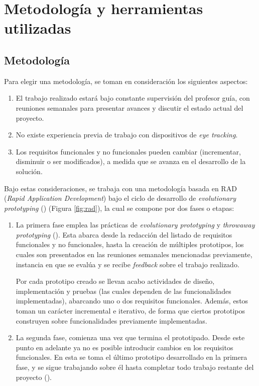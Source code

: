 \section{Metodolog\'ia y herramientas utilizadas}
\label{intro:metodologia}

\subsection{Metodolog\'ia}
Para elegir una metodología, se toman en consideración los siguientes aspectos:
\begin{enumerate}
    \item El trabajo realizado estará bajo constante supervisión del profesor guía, con reuniones semanales para presentar avances y discutir el estado actual del proyecto.
    \item No existe experiencia previa de trabajo con dispositivos de \textit{eye tracking}.
    \item Los requisitos funcionales y no funcionales pueden cambiar (incrementar, disminuir o ser modificados), a medida que se avanza en el desarrollo de la solución.
\end{enumerate}

Bajo estas consideraciones, se trabaja con una metodología basada en RAD (\textit{Rapid Application Development}) bajo el ciclo de desarrollo de \textit{evolutionary prototyping} (\cite{mcconnell_96}) (Figura \ref{fig:rad}), la cual se compone por dos fases o etapas:

\begin{enumerate}
    \item La primera fase emplea las prácticas de \textit{evolutionary prototyping} y \textit{throwaway prototyping} (\cite{mcconnell_96}). Esta abarca desde la redacción del listado de requisitos funcionales y no funcionales, hasta la creación de múltiples prototipos, los cuales son presentados en las reuniones semanales mencionadas previamente, instancia en que se evalúa y se recibe \textit{feedback} sobre el trabajo realizado.

    Por cada prototipo creado se llevan acabo actividades de diseño, implementación y pruebas (las cuales dependen de las funcionalidades implementadas), abarcando uno o dos requisitos funcionales. Además, estos toman un carácter incremental e iterativo, de forma que ciertos prototipos construyen sobre funcionalidades previamente implementadas.
    
    \item La segunda fase, comienza una vez que termina el prototipado. Desde este punto en adelante ya no es posible introducir cambios en los requisitos funcionales. En esta se toma el último prototipo desarrollado en la primera fase, y se sigue trabajando sobre él hasta completar todo trabajo restante del proyecto (\cite{mcconnell_96}).
\end{enumerate}

